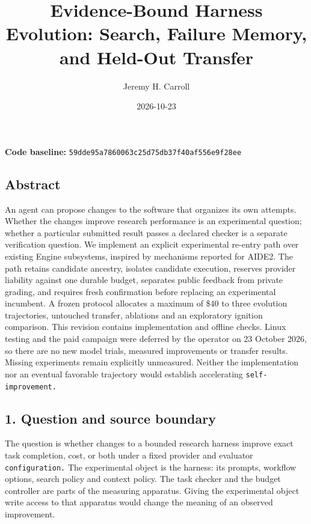 \documentclass[
  11pt,
]{article}
\title{Evidence-Bound Harness Evolution: Search, Failure Memory, and
Held-Out Transfer}
\author{Jeremy H. Carroll}
\date{2026-10-23}
\begin{document}
\makeatletter
\begin{center}
{\LARGE \@title\par}
\vspace{0.8em}
{\normalsize \@author\par}
\vspace{0.5em}
{\small \@date\par}
\end{center}
\makeatother

\textbf{Code baseline:}
\nolinkurl{59dde95a7860063c25d75db37f40af556e9f28ee}

\subsection{Abstract}\label{abstract}

An agent can propose changes to the software that organizes its own
attempts. Whether the changes improve research performance is an
experimental question; whether a particular submitted result passes a
declared checker is a separate verification question. We implement an
explicit experimental re-entry path over existing Engine
subsystems, inspired by mechanisms reported for AIDE2. The path retains
candidate ancestry, isolates candidate execution, reserves provider
liability against one durable budget, separates public feedback from
private grading, and requires fresh confirmation before replacing an
experimental incumbent. A frozen protocol allocates a maximum of \$40 to
three evolution trajectories, untouched transfer, ablations and an
exploratory ignition comparison. This revision contains implementation
and offline checks. Linux testing and the paid campaign were deferred by
the operator on 23 October 2026, so there are no new model trials,
measured improvements or transfer results. Missing experiments remain
explicitly unmeasured. Neither the implementation nor an eventual
favorable trajectory would establish accelerating
\nolinkurl{self-improvement.}

\subsection{1. Question and source
boundary}\label{question-and-source-boundary}

The question is whether changes to a bounded research harness improve
exact task completion, cost, or both under a fixed provider and
evaluator \nolinkurl{configuration.} The experimental object is the
harness: its prompts, workflow options, search policy and context
policy. The task checker and the budget controller are parts of the
measuring apparatus. Giving the experimental object write access to that
apparatus would change the meaning of an observed improvement.
\end{document}
